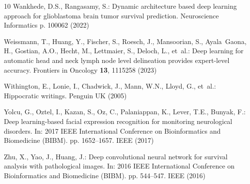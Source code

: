 \documentclass[runningheads]{llncs}
\begin{document}
\begin{thebibliography}{10}
Wankhede, D.S., Rangasamy, S.: Dynamic architecture based deep learning
  approach for glioblastoma brain tumor survival prediction. Neuroscience
  Informatics p. 100062 (2022)

Weissmann, T., Huang, Y., Fischer, S., Roesch, J., Mansoorian, S., Ayala~Gaona,
  H., Gostian, A.O., Hecht, M., Lettmaier, S., Deloch, L., et~al.: Deep
  learning for automatic head and neck lymph node level delineation provides
  expert-level accuracy. Frontiers in Oncology  \textbf{13},  1115258 (2023)

Withington, E., Lonie, I., Chadwick, J., Mann, W.N., Lloyd, G., et~al.:
  Hippocratic writings. Penguin UK (2005)

Yolcu, G., Oztel, I., Kazan, S., Oz, C., Palaniappan, K., Lever, T.E., Bunyak,
  F.: Deep learning-based facial expression recognition for monitoring
  neurological disorders. In: 2017 IEEE International Conference on
  Bioinformatics and Biomedicine (BIBM). pp. 1652--1657. IEEE (2017)

Zhu, X., Yao, J., Huang, J.: Deep convolutional neural network for survival
  analysis with pathological images. In: 2016 IEEE International Conference on
  Bioinformatics and Biomedicine (BIBM). pp. 544--547. IEEE (2016)

\end{thebibliography}
\end{document}
